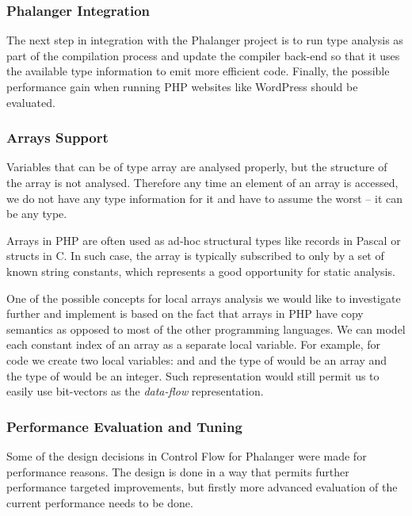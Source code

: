         \subsubsection*{Phalanger Integration}
        The next step in integration with the Phalanger project 
        is to run type analysis as part of the compilation 
        process and update the compiler back-end so that it uses the 
        available type information to emit more efficient code.
        Finally, the possible performance gain when running 
        PHP websites like WordPress should be evaluated.
        
        \subsubsection*{Arrays Support}
        Variables that can be of type array are analysed properly, 
        but the structure of the array is not analysed. Therefore 
        any time an element of an array is accessed, we do not 
        have any type information for it and have to assume 
        the worst -- it can be any type.
        
        Arrays in PHP are often used as ad-hoc structural 
        types like records in Pascal or structs in C. 
        In such case, the array is typically subscribed to 
        only by a set of known string constants, 
        which represents a good opportunity for 
        static analysis.
        
        One of the possible concepts for local arrays 
        analysis we would like to investigate further 
        and implement is based on the fact that arrays 
        in PHP have copy semantics as opposed to most 
        of the other programming languages. We can model each constant 
        index of an array as a separate local variable. 
        For example, for code  we create 
        two local variables:  and  
        and the type of  would be an array and 
        the type of  would be an integer. 
        Such representation would still permit us to easily use 
        bit-vectors as the \emph{data-flow} representation.
        
        \subsubsection*{Performance Evaluation and Tuning}
        Some of the design decisions in Control Flow for 
        Phalanger were made for performance reasons. The 
        design is done in a way that permits further 
        performance targeted improvements, but firstly 
        more advanced evaluation of the current performance 
        needs to be done.
        
